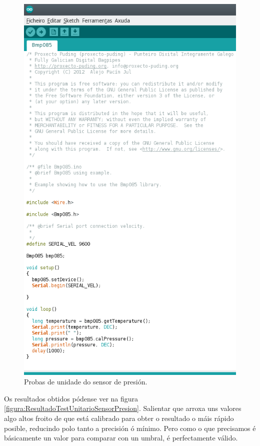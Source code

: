   \begin{figure}[htbp]
   \centering
   \includegraphics[scale=0.8,keepaspectratio=true]{./imagenes/test-sensor-presion.png}
   \caption{Probas de unidade do sensor de presión.}
   \label{figura:TestUnitarioSensorPresion}
  \end{figure}
  
  Os resultados obtidos pódense ver na figura
  \ref{figura:ResultadoTestUnitarioSensorPresion}. Salientar que arroxa uns
  valores algo altos froito de que está calibrado para obter o resultado o máis
  rápido posible, reducindo polo tanto a precisión ó mínimo. Pero como o que
  precisamos é básicamente un valor para comparar con un umbral, é perfectamente
  válido. \\
  
